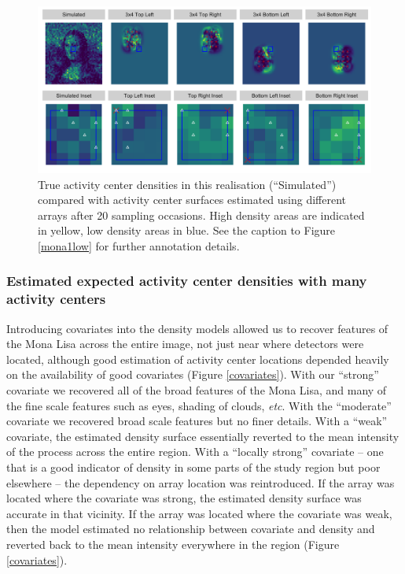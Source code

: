 \documentclass[10pt,a4paper]{article}
\begin{document}
\begin{figure}[htbp]
\centering
\includegraphics[width=1\textwidth]{many_faces_mona_higheffort.png}
\caption{True activity center densities in this realisation (``Simulated'') compared with activity center surfaces estimated using different arrays after 20 sampling occasions. High density areas are indicated in yellow, low density areas in blue. See the caption to Figure \ref{mona1low} for further annotation details.}
\label{mona1hi}
\end{figure}

\subsubsection{Estimated expected activity center densities with many activity centers}

Introducing covariates into the density models allowed us to recover features of the Mona Lisa across the entire image, not just near where detectors were located, although good estimation of activity center locations depended heavily on the availability of good covariates (Figure \ref{covariates}). With our ``strong'' covariate we recovered all of the broad features of the Mona Lisa, and many of the fine scale features such as eyes, shading of clouds, {\it etc}. With the ``moderate'' covariate we recovered broad scale features but no finer details. With a ``weak'' covariate, the estimated density surface essentially reverted to the mean intensity of the process across the entire region. With a ``locally strong'' covariate -- one that is a good indicator of density in some parts of the study region but poor elsewhere -- the dependency on array location was reintroduced. If the array was located where the covariate was strong, the estimated density surface was accurate in that vicinity. If the array was located where the covariate was weak, then the model estimated no relationship between covariate and density and reverted back to the mean intensity everywhere in the region (Figure \ref{covariates}). 
\end{document}
